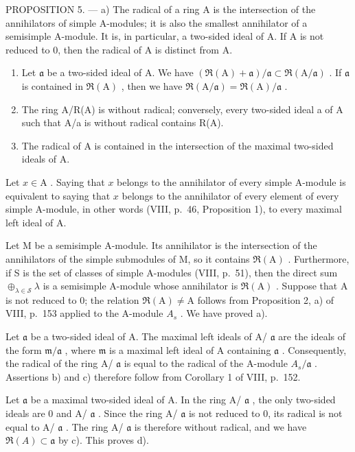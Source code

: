 PROPOSITION 5. --- a) The radical of a ring A is the intersection of the annihilators of simple A-modules; it is also the smallest annihilator of a semisimple A-module. It is, in particular, a two-sided ideal of A. If A is not reduced to 0, then the radical of A is distinct from A.

\begin{enumerate}
\def\labelenumi{\alph{enumi})}
\setcounter{enumi}{1}
\item
  Let \(\mathfrak{a}\) be a two-sided ideal of A. We have \((\Re (\mathrm{A}) + \mathfrak{a}) / \mathfrak{a} \subset \Re (\mathrm{A} / \mathfrak{a})\) . If \(\mathfrak{a}\) is contained in \(\Re (\mathrm{A})\) , then we have \(\Re (\mathrm{A} / \mathfrak{a}) = \Re (\mathrm{A}) / \mathfrak{a}\) .
\item
  The ring A/R(A) is without radical; conversely, every two-sided ideal a of A such that A/a is without radical contains R(A).
\item
  The radical of A is contained in the intersection of the maximal two-sided ideals of A.
\end{enumerate}

Let \(x \in \mathrm{A}\) . Saying that \(x\) belongs to the annihilator of every simple A-module is equivalent to saying that \(x\) belongs to the annihilator of every element of every simple A-module, in other words (VIII, p.~46, Proposition 1), to every maximal left ideal of A.

Let M be a semisimple A-module. Its annihilator is the intersection of the annihilators of the simple submodules of M, so it contains \(\Re(\mathrm{A})\) . Furthermore, if S is the set of classes of simple A-modules (VIII, p.~51), then the direct sum \(\oplus_{\lambda\in\mathcal{S}}\lambda\) is a semisimple A-module whose annihilator is \(\Re(\mathrm{A})\) . Suppose that A is not reduced to 0; the relation \(\Re(\mathrm{A})\neq\mathrm{A}\) follows from Proposition 2, a) of VIII, p.~153 applied to the A-module \(A_{s}\) . We have proved a).

Let \(\mathfrak{a}\) be a two-sided ideal of A. The maximal left ideals of A/ \(\mathfrak{a}\) are the ideals of the form \(\mathfrak{m}/\mathfrak{a}\) , where \(\mathfrak{m}\) is a maximal left ideal of A containing \(\mathfrak{a}\) . Consequently, the radical of the ring A/ \(\mathfrak{a}\) is equal to the radical of the A-module \(A_s/\mathfrak{a}\) . Assertions b) and c) therefore follow from Corollary 1 of VIII, p.~152.

Let \(\mathfrak{a}\) be a maximal two-sided ideal of A. In the ring A/ \(\mathfrak{a}\) , the only two-sided ideals are 0 and A/ \(\mathfrak{a}\) . Since the ring A/ \(\mathfrak{a}\) is not reduced to 0, its radical is not equal to A/ \(\mathfrak{a}\) . The ring A/ \(\mathfrak{a}\) is therefore without radical, and we have \(\Re(A) \subset \mathfrak{a}\) by c). This proves d).

